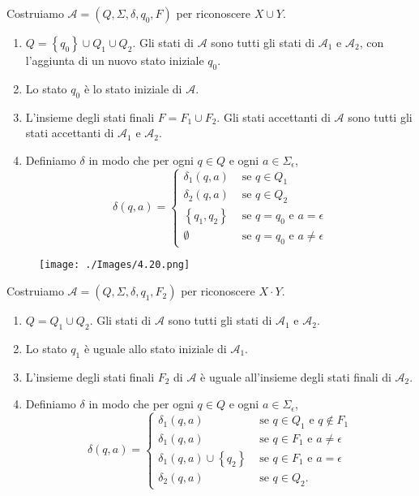 Costruiamo $\mathcal{A}=\left(Q, \Sigma, \delta, q_{0}, F\right)$ per riconoscere $X \cup Y$.
\begin{enumerate}
    \item $Q=\left\{q_{0}\right\} \cup Q_{1} \cup Q_{2}$.
Gli stati di $\mathcal{A}$ sono tutti gli stati di $\mathcal{A}_{1}$ e $\mathcal{A}_{2}$, con l'aggiunta di un nuovo stato iniziale $q_{0}$.
    \item Lo stato $q_{0}$ è lo stato iniziale di $\mathcal{A}$.
    \item L'insieme degli stati finali $F=F_{1} \cup F_{2}$.
Gli stati accettanti di $\mathcal{A}$ sono tutti gli stati accettanti di $\mathcal{A}_{1}$ e $\mathcal{A}_{2} .$
    \item Definiamo $\delta$ in modo che per ogni $q \in Q$ e ogni $a \in \Sigma_{\epsilon}$,
$$
\delta(q, a)= \begin{cases}\delta_{1}(q, a) & \text { se } q \in Q_{1} \\ \delta_{2}(q, a) & \text { se } q \in Q_{2} \\ \left\{q_{1}, q_{2}\right\} & \text { se } q=q_{0} \text { e } a=\epsilon \\ \emptyset & \text { se } q=q_{0} \text { e } a \neq \epsilon\end{cases}
$$
\end{enumerate}

\begin{figure}[hbpt!]
    \centering
    \texttt{[image: ./Images/4.20.png]}
\end{figure}
\FloatBarrier

Costruiamo $\mathcal{A}=\left(Q, \Sigma, \delta, q_{1}, F_{2}\right)$ per riconoscere $X \cdot Y$.
\begin{enumerate}
    \item  $Q=Q_{1} \cup Q_{2}$.
Gli stati di $\mathcal{A}$ sono tutti gli stati di $\mathcal{A}_{1}$ e $\mathcal{A}_{2}$.
    \item Lo stato $q_{1}$ è uguale allo stato iniziale di $\mathcal{A}_{1}$.
    \item L'insieme degli stati finali $F_{2}$ di $\mathcal{A}$ è uguale all'insieme degli stati finali di $\mathcal{A}_{2}$.
    \item Definiamo $\delta$ in modo che per ogni $q \in Q$ e ogni $a \in \Sigma_{\epsilon}$,
$$
\delta(q, a)= \begin{cases}\delta_{1}(q, a) & \text { se } q \in Q_{1} \text { e } q \notin F_{1} \\ \delta_{1}(q, a) & \text { se } q \in F_{1} \text { e } a \neq \epsilon \\ \delta_{1}(q, a) \cup\left\{q_{2}\right\} & \text { se } q \in F_{1} \text { e } a=\epsilon \\ \delta_{2}(q, a) & \text { se } q \in Q_{2} .\end{cases}
$$
\end{enumerate}

